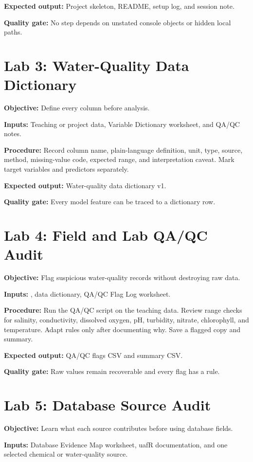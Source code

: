 \textbf{Expected output:} Project skeleton, README, setup log, and session note.

\textbf{Quality gate:} No step depends on unstated console objects or hidden local paths.

\section{Lab 3: Water-Quality Data Dictionary}
\textbf{Objective:} Define every column before analysis.

\textbf{Inputs:} Teaching or project data, Variable Dictionary worksheet, and QA/QC notes.

\textbf{Procedure:} Record column name, plain-language definition, unit, type, source, method, missing-value code, expected range, and interpretation caveat. Mark target variables and predictors separately.

\textbf{Expected output:} Water-quality data dictionary v1.

\textbf{Quality gate:} Every model feature can be traced to a dictionary row.

\section{Lab 4: Field and Lab QA/QC Audit}
\textbf{Objective:} Flag suspicious water-quality records without destroying raw data.

\textbf{Inputs:} , data dictionary, QA/QC Flag Log worksheet.

\textbf{Procedure:} Run the QA/QC script on the teaching data. Review range checks for salinity, conductivity, dissolved oxygen, pH, turbidity, nitrate, chlorophyll, and temperature. Adapt rules only after documenting why. Save a flagged copy and summary.

\textbf{Expected output:} QA/QC flags CSV and summary CSV.

\textbf{Quality gate:} Raw values remain recoverable and every flag has a rule.

\section{Lab 5: Database Source Audit}
\textbf{Objective:} Learn what each source contributes before using database fields.

\textbf{Inputs:} Database Evidence Map worksheet, uafR documentation, and one selected chemical or water-quality source.

